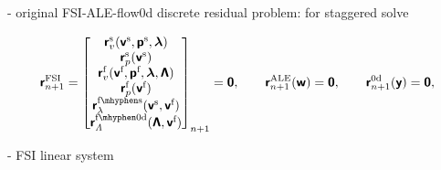 \documentclass[a4paper,12pt]{report}
\newcommand{\fS}{\text{s}}
\newcommand{\fF}{\text{f}}
\newcommand{\bs}[1]{\boldsymbol{#1}}
\newcommand{\zd}{\bs{\mathsf{y}}} %
\newcommand{\VF}{\bs{\mathsf{v}}^{\fF}}
\newcommand{\VS}{\bs{\mathsf{v}}^{\fS}}
\newcommand{\PF}{\bs{\mathsf{p}}^{\fF}}
\newcommand{\PS}{\bs{\mathsf{p}}^{\fS}}
\newcommand{\VA}{\bs{\mathsf{w}}}
\newcommand{\LM}{\bs{\mathsf{\lambda}}}
\newcommand{\LMZ}{\bs{\mathsf{\Lambda}}}
\newcommand{\Y}{\bs{\mathsf{y}}} %
\newcommand{\lmi}{\lambda} %
\newcommand{\lmzi}{\mathit{\Lambda}} %
\begin{document}
- original FSI-ALE-flow0d discrete residual problem: for staggered solve

\begin{align}
    \bs{\mathsf{r}}_{n+1}^{\mathrm{FSI}} 
    = \begin{bmatrix}
    \bs{\mathsf{r}}_{v}^{\fS}(\VS,\PS,\LM) \\ \bs{\mathsf{r}}_{p}^{\fS}(\VS) \\ \bs{\mathsf{r}}_{v}^{\fF}(\VF,\PF,\LM,\LMZ) \\ \bs{\mathsf{r}}_{p}^{\fF}(\VF) \\ \bs{\mathsf{r}}_{\lmi}^{\mathrm{\fF\mhyphen\fS}}(\VS,\VF) \\ \bs{\mathsf{r}}_{\lmzi}^{\mathrm{\fF\mhyphen 0d}}(\LMZ,\VF)
    \end{bmatrix}_{n+1} 
    = \bs{\mathsf{0}},
    \qquad \bs{\mathsf{r}}_{n+1}^{\mathrm{ALE}}(\VA) = \bs{\mathsf{0}},
    \qquad \bs{\mathsf{r}}_{n+1}^{\mathrm{0d}}(\Y) = \bs{\mathsf{0}},\label{eq:res_nonlin_fsi}
\end{align}

- FSI linear system
\end{document}
